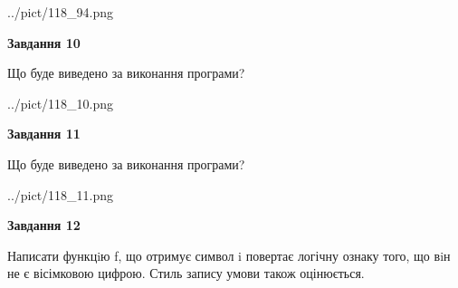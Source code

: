 \documentclass[12pt, ukrainian]{article}
\begin{document}
{\begin {large}
\begin{center}
	{../pict/118_94.png}
\end{center}
\newpage

{\begin {center}\textbf{Завдання 10}\end {center}}

Що буде виведено за виконання програми?\par
\begin{center}
	{../pict/118_10.png}
\end{center}
\newpage

{\begin {center}\textbf{Завдання 11}\end {center}}

Що буде виведено за виконання програми?\par
\begin{center}
	{../pict/118_11.png}
\end{center}
\newpage

{\begin {center}\textbf{Завдання 12}\end {center}}


Написати функцiю f, що отримує символ i повертає логічну ознаку того, що вiн не є вісімковою цифрою. Стиль запису умови також оцінюється.\par
\newpage

\end {large}}
\end{document}

